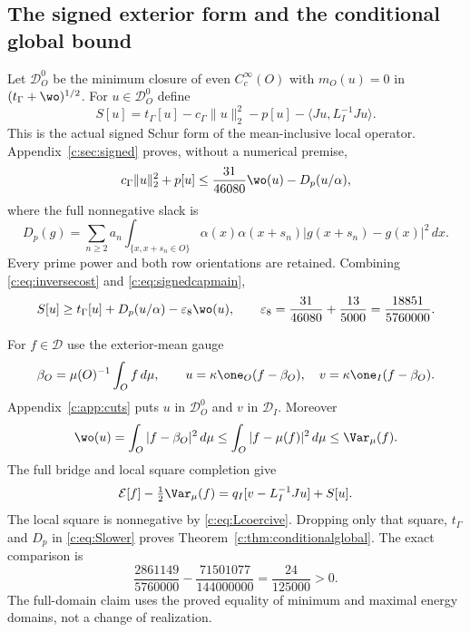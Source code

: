 \documentclass[11pt,a4paper]{article}
\numberwithin{equation}{section}
\theoremstyle{definition}\newtheorem{definition}[theorem]{Definition}
\theoremstyle{remark}\newtheorem{remark}[theorem]{Remark}
\newcommand{\E}{\mathcal E}\newcommand{\D}{\mathcal D}
\newcommand{\tg}{t_\Gamma}\newcommand{\cg}{c_\Gamma}
\newcommand{\ip}[2]{\langle#1,#2\rangle}\newcommand{\norm}[1]{\lVert#1\rVert}\newcommand{\abs}[1]{\lvert#1\rvert}
\begin{document}
\subsection{The signed exterior form and the conditional global bound}\label{c:sec:conditionalproof}
Let $\D_O^0$ be the minimum closure of even $C_c^\infty(O)$ with
$m_O(u)=0$ in $(\tg+\wo)^{1/2}$.
For $u\in\D_O^0$ define
\[
 S[u]=\tg[u]-\cg\norm u_2^2-p[u]-\ip{Ju}{L_I^{-1}Ju}.
\]
This is the actual signed Schur form of the mean-inclusive local operator.
Appendix~\ref{c:sec:signed} proves, without a numerical premise,
\begin{equation}\label{c:eq:signedcapmain}
 \cg\norm u_2^2+p[u]\le\frac{31}{46080}\wo(u)-D_p(u/\alpha),
\end{equation}
where the full nonnegative slack is
\[
 D_p(g)=\sum_{n\ge2}a_n\int_{\{x,x+s_n\in O\}}
  \alpha(x)\alpha(x+s_n)|g(x+s_n)-g(x)|^2\,dx.
\]
Every prime power and both row orientations are retained.
Combining \eqref{c:eq:inversecost} and \eqref{c:eq:signedcapmain},
\begin{equation}\label{c:eq:Slower}
 S[u]\ge\tg[u]+D_p(u/\alpha)-\varepsilon_8\wo(u),\qquad
 \varepsilon_8=\frac{31}{46080}+\frac{13}{5000}
 =\frac{18851}{5760000}.
\end{equation}

For $f\in\D$ use the exterior-mean gauge
\[
 \beta_O=\mu(O)^{-1}\int_Of\,d\mu,\qquad
 u=\kappa\one_O(f-\beta_O),\quad
 v=\kappa\one_I(f-\beta_O).
\]
Appendix~\ref{c:app:cuts} puts $u$ in $\D_O^0$ and $v$ in $\D_I$.
Moreover
\[
 \wo(u)=\int_O|f-\beta_O|^2\,d\mu
 \le\int_O|f-\mu(f)|^2\,d\mu\le\Var_\mu(f).
\]
The full bridge and local square completion give
\begin{equation}\label{c:eq:squaremain}
 \E[f]-\tfrac12\Var_\mu(f)=q_I[v-L_I^{-1}Ju]+S[u].
\end{equation}
The local square is nonnegative by \eqref{c:eq:Lcoercive}.
Dropping only that square, $\tg$ and $D_p$ in \eqref{c:eq:Slower} proves
Theorem~\ref{c:thm:conditionalglobal}.
The exact comparison is
\[
 \frac{2861149}{5760000}-\frac{71501077}{144000000}
 =\frac{24}{125000}>0.
\]
The full-domain claim uses the proved equality of minimum and maximal energy domains, not a change of realization.
\end{document}
